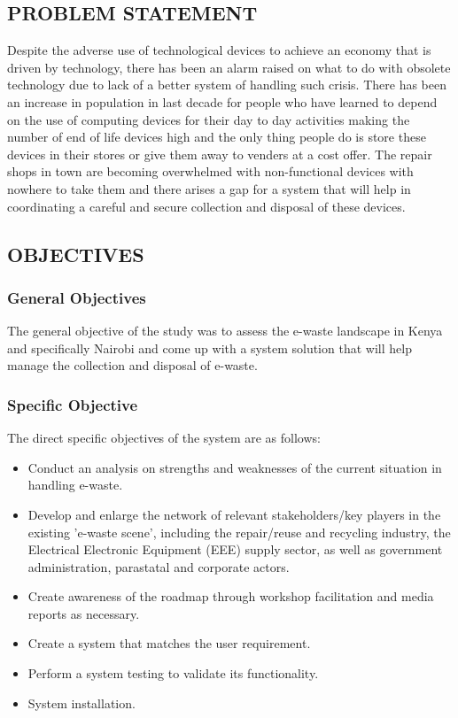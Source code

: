 \documentclass{article}
\begin{document}
\subsection{PROBLEM STATEMENT}
Despite the adverse use of technological devices to achieve an economy that is driven by technology, there has been an alarm raised on what to do with obsolete technology due to lack of a better system of handling such crisis. There has been an increase in population in last decade for people who have learned to depend on the use of computing devices for their day to day activities making the number of end of life devices high and the only thing people do is store these devices in their stores or give them away to venders at a cost offer. The repair shops in town are becoming overwhelmed with non-functional devices with nowhere to take them and there arises a gap for a system that will help in coordinating a careful and secure collection and disposal of these devices.
\subsection{ OBJECTIVES}
\subsubsection{General Objectives}
The general objective of the study was to assess the e-waste landscape in Kenya and specifically Nairobi and come up with a system solution that will help manage the collection and disposal of e-waste.
\subsubsection{Specific Objective}
The direct specific objectives of the system are as follows:
\begin{itemize}
\item Conduct an analysis on strengths and weaknesses of the current situation in handling e-waste.
\item Develop and enlarge the network of relevant stakeholders/key players in the existing 'e-waste scene', including the repair/reuse and recycling industry, the Electrical Electronic Equipment (EEE) supply sector, as well as government administration, parastatal and corporate actors.
\item Create awareness of the roadmap through workshop facilitation and media reports as necessary.
\item Create a system that matches the user requirement.
\item Perform a system testing to validate its functionality.
\item System installation.
\end{itemize}
\end{document}
